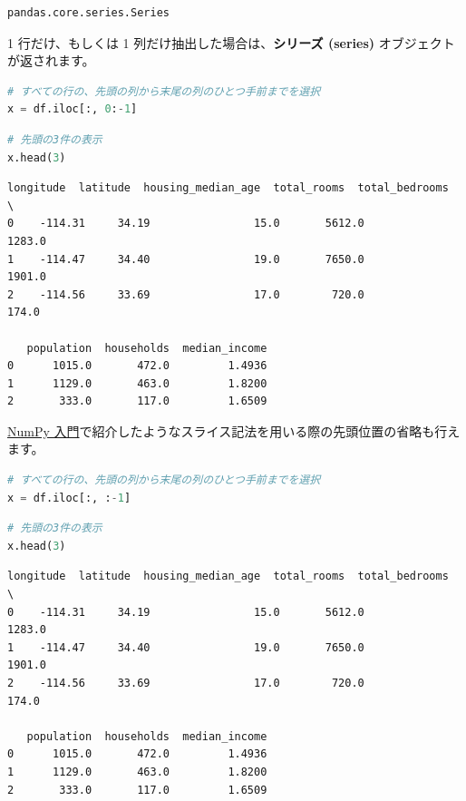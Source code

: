 \begin{lstlisting}[style=outputcell]
pandas.core.series.Series
\end{lstlisting}

1 行だけ、もしくは 1 列だけ抽出した場合は、\textbf{シリーズ (series)} オブジェクトが返されます。


\begin{lstlisting}[style=codecell,language=Python]
# すべての行の、先頭の列から末尾の列のひとつ手前までを選択
x = df.iloc[:, 0:-1]
\end{lstlisting}

\begin{lstlisting}[style=codecell,language=Python]
# 先頭の3件の表示
x.head(3)
\end{lstlisting}

\begin{lstlisting}[style=outputcell]
   longitude  latitude  housing_median_age  total_rooms  total_bedrooms  \
0    -114.31     34.19                15.0       5612.0          1283.0   
1    -114.47     34.40                19.0       7650.0          1901.0   
2    -114.56     33.69                17.0        720.0           174.0   

   population  households  median_income  
0      1015.0       472.0         1.4936  
1      1129.0       463.0         1.8200  
2       333.0       117.0         1.6509  
\end{lstlisting}

\href{08_Introduction_to_NumPy_ja.ipynb}{NumPy 入門}で紹介したようなスライス記法を用いる際の先頭位置の省略も行えます。


\begin{lstlisting}[style=codecell,language=Python]
# すべての行の、先頭の列から末尾の列のひとつ手前までを選択
x = df.iloc[:, :-1]
\end{lstlisting}

\begin{lstlisting}[style=codecell,language=Python]
# 先頭の3件の表示
x.head(3)
\end{lstlisting}

\begin{lstlisting}[style=outputcell]
   longitude  latitude  housing_median_age  total_rooms  total_bedrooms  \
0    -114.31     34.19                15.0       5612.0          1283.0   
1    -114.47     34.40                19.0       7650.0          1901.0   
2    -114.56     33.69                17.0        720.0           174.0   

   population  households  median_income  
0      1015.0       472.0         1.4936  
1      1129.0       463.0         1.8200  
2       333.0       117.0         1.6509  
\end{lstlisting}

